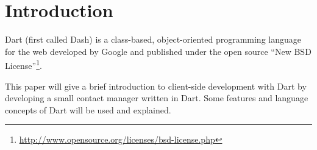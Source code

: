 \section{Introduction}

Dart (first called Dash)  is a class-based, object-oriented programming language for the web developed by Google and published under the open source ``New BSD License''\footnote{\url{http://www.opensource.org/licenses/bsd-license.php}}.\cite{Wikipedia} %


This paper will give a brief introduction to client-side development with Dart by developing a small contact manager written in Dart. Some features and language concepts of Dart will be used and explained.%
